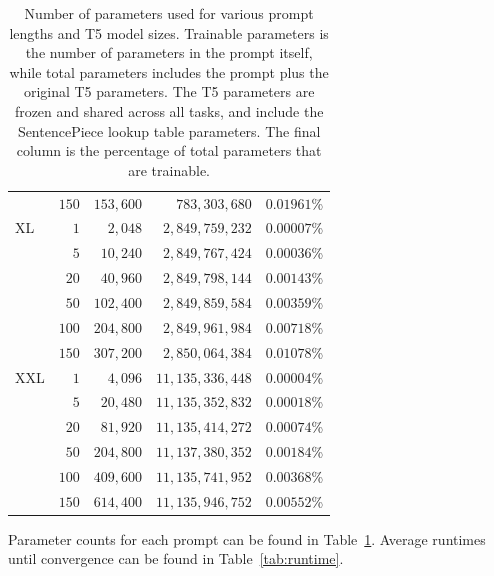 \documentclass[11pt]{article}
\begin{document}
\begin{table}[t]
\begin{tabular}{l r |r r r}
            & $150$         & $153{,}600$          & $783{,}303{,}680$      &  $0.01961$\% \\
    XL      & $1$           & $2{,}048$            & $2{,}849{,}759{,}232$  &  $0.00007$\% \\
            & $5$           & $10{,}240$           & $2{,}849{,}767{,}424$  &  $0.00036$\% \\
            & $20$          & $40{,}960$           & $2{,}849{,}798{,}144$  &  $0.00143$\% \\
            & $50$          & $102{,}400$          & $2{,}849{,}859{,}584$  &  $0.00359$\% \\
            & $100$         & $204{,}800$          & $2{,}849{,}961{,}984$  &  $0.00718$\% \\
            & $150$         & $307{,}200$          & $2{,}850{,}064{,}384$  &  $0.01078$\% \\
    XXL     & $1$           & $4{,}096$            & $11{,}135{,}336{,}448$ &  $0.00004$\% \\
            & $5$           & $20{,}480$           & $11{,}135{,}352{,}832$ &  $0.00018$\% \\
            & $20$          & $81{,}920$           & $11{,}135{,}414{,}272$ &  $0.00074$\% \\
            & $50$          & $204{,}800$          & $11{,}137{,}380{,}352$ &  $0.00184$\% \\
            & $100$         & $409{,}600$          & $11{,}135{,}741{,}952$ &  $0.00368$\% \\
            & $150$         & $614{,}400$          & $11{,}135{,}946{,}752$ &  $0.00552$\% \\
    \bottomrule
    \end{tabular}
    \caption{Number of parameters used for various prompt lengths and T5 model sizes. Trainable parameters is the number of parameters in the prompt itself, while total parameters includes the prompt plus the original T5 parameters. The T5 parameters are frozen and shared across all tasks, and include the SentencePiece lookup table parameters. The final column is the percentage of total parameters that are trainable.}
    \label{tab:prompt-parameter-counts}
\end{table}

Parameter counts for each prompt can be found in Table~\ref{tab:prompt-parameter-counts}. Average runtimes until convergence can be found in Table~\ref{tab:runtime}.
\end{document}
